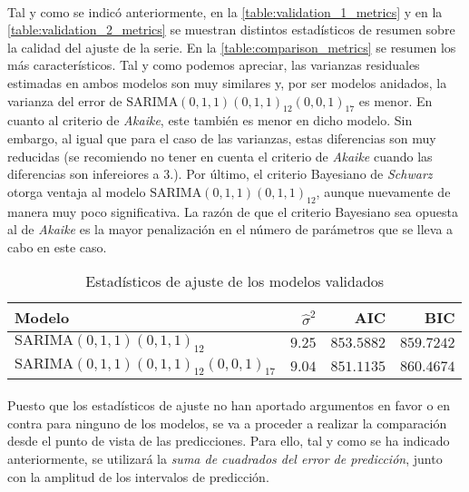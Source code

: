 \documentclass[a4paper, spanish]{article}
\begin{document}
    \paragraph{}
    Tal y como se indicó anteriormente, en la \autoref{table:validation_1_metrics} y en la \autoref{table:validation_2_metrics} se muestran distintos estadísticos de resumen sobre la calidad del ajuste de la serie. En la \autoref{table:comparison_metrics} se resumen los más característicos. Tal y como podemos apreciar, las varianzas residuales estimadas en ambos modelos son muy similares y, por ser modelos anidados, la varianza del error de $\text{SARIMA}(0, 1, 1)(0, 1, 1)_{12}(0, 0, 1)_{17}$ es menor. En cuanto al criterio de \emph{Akaike}, este también es menor en dicho modelo. Sin embargo, al igual que para el caso de las varianzas, estas diferencias son muy reducidas (se recomiendo no tener en cuenta el criterio de \emph{Akaike} cuando las diferencias son infereiores a $3$.). Por último, el criterio Bayesiano de \emph{Schwarz} otorga ventaja al modelo $\text{SARIMA}(0, 1, 1)(0, 1, 1)_{12}$, aunque nuevamente de manera muy poco significativa. La razón de que el criterio Bayesiano sea opuesta al de \emph{Akaike} es la mayor penalización en el número de parámetros que se lleva a cabo en este caso.

    \begin{table}[htb!]
      \centering
      \begin{tabular}{|l|r|r|r|}
        \hline
        \textbf{Modelo} & \textbf{$\widehat{\sigma}^2$} & \textbf{AIC} & \textbf{BIC} \\ \hline
        $\text{SARIMA}(0, 1, 1)(0, 1, 1)_{12}$ & $9.25$ & $853.5882$ & $859.7242$ \\ \hline
        $\text{SARIMA}(0, 1, 1)(0, 1, 1)_{12}(0, 0, 1)_{17}$ & $9.04$ & $851.1135$ & $860.4674$ \\ \hline
      \end{tabular}
      \caption{Estadísticos de ajuste de los modelos validados}
      \label{table:comparison_metrics}
    \end{table}

    \paragraph{}
    Puesto que los estadísticos de ajuste no han aportado argumentos en favor o en contra para ninguno de los modelos, se va a proceder a realizar la comparación desde el punto de vista de las predicciones. Para ello, tal y como se ha indicado anteriormente, se utilizará la \emph{suma de cuadrados del error de predicción}, junto con la amplitud de los intervalos de predicción.
\end{document}
